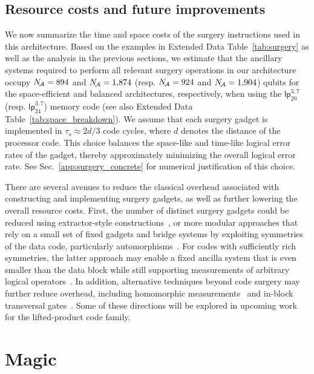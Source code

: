 \documentclass[reprint,twocolumn,secnumarabic,amssymb, aps, prx]{revtex4-2}
\newcommand{\lpmemlarge}{\mbox{$\mathsf{lp}_{24}^{3, 7}$}}
\newcommand{\lpmemmed}{\mbox{$\mathsf{lp}^{3, 7}_{20}$}}
\newcommand{\Na}{N_{\text{\!}\mathcal{A}}}
\newcommand{\taus}{\tau_s}
\begin{document}
\subsection{Resource costs and future improvements \label{app:surgery_discussion}}
We now summarize the time and space costs of the surgery instructions used in this architecture.
Based on the examples in Extended Data Table~\ref{tab:surgery} as well as the analysis in the previous sections, we estimate that the ancillary systems required to perform all relevant surgery operations in our architecture occupy $\Na = 894$ and $\Na = 1{,}874$ (resp. $\Na = 924$ and $\Na = 1{,}904$) qubits for the space-efficient and balanced architectures, respectively, when using the $\lpmemmed$ (resp. $\lpmemlarge$) memory code (see also Extended Data Table~\ref{tab:space_breakdown}). We assume that each surgery gadget is implemented in $\taus \approx 2d/3$ code cycles, where $d$ denotes the distance of the processor code. This choice balances the space-like and time-like logical error rates of the gadget, thereby approximately minimizing the overall logical error rate. See Sec.~\ref{app:surgery_concrete} for numerical justification of this choice.

There are several avenues to reduce the classical overhead associated with constructing and implementing surgery gadgets, as well as further lowering the overall resource costs. First, the number of distinct surgery gadgets could be reduced using extractor-style constructions~\cite{he2025extractors}, or more modular approaches that rely on a small set of fixed gadgets and bridge systems by exploiting symmetries of the data code, particularly automorphisms~\cite{cross2024improved, webster2025explicit, webster2026pinnacle}. For codes with sufficiently rich symmetries, the latter approach may enable a fixed ancilla system that is even smaller than the data block while still supporting measurements of arbitrary logical operators~\cite{webster2025explicit}. In addition, alternative techniques beyond code surgery may further reduce overhead, including homomorphic measurements~\cite{huang2022homomorphic, xu2025fast, yang2026rascql} and in-block transversal gates~\cite{malcolm2025computing, yang2026rascql, sayginel2025fault}. Some of these directions will be explored in upcoming work~\cite{zheng2026high} for the lifted-product code family. 

\section{Magic\label{app:magic}}
\end{document}
